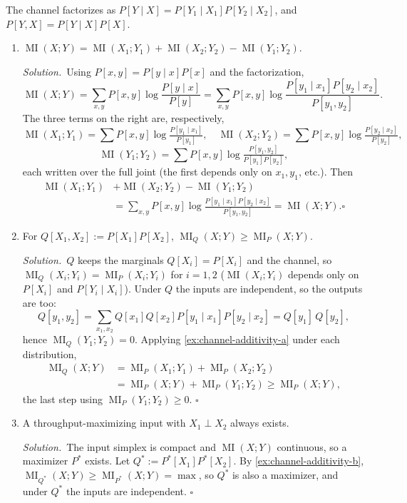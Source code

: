 \documentclass[11pt]{article}
\DeclareMathOperator{\MI}{MI}
\newcommand{\soln}{\medskip\noindent\textit{Solution.}\ }
\renewcommand{\qed}{\ensuremath{\square}}
\begin{document}
\begin{solution}
The channel factorizes as $P[Y\mid X]=P[Y_1\mid X_1]P[Y_2\mid X_2]$, and $P[Y,X]=P[Y\mid X]P[X]$.

\begin{enumerate}
\item $\MI(X;Y)=\MI(X_1;Y_1)+\MI(X_2;Y_2)-\MI(Y_1;Y_2)$.

\soln Using $P[x,y]=P[y\mid x]P[x]$ and the factorization,
\[
  \MI(X;Y)=\sum_{x,y}P[x,y]\log\frac{P[y\mid x]}{P[y]}
  =\sum_{x,y}P[x,y]\log\frac{P[y_1\mid x_1]P[y_2\mid x_2]}{P[y_1,y_2]}.
\]
The three terms on the right are, respectively,
\[
  \MI(X_1;Y_1)=\sum P[x,y]\log\tfrac{P[y_1\mid x_1]}{P[y_1]},\quad
  \MI(X_2;Y_2)=\sum P[x,y]\log\tfrac{P[y_2\mid x_2]}{P[y_2]},
\]
\[
  \MI(Y_1;Y_2)=\sum P[x,y]\log\tfrac{P[y_1,y_2]}{P[y_1]P[y_2]},
\]
each written over the full joint (the first depends only on $x_1,y_1$, etc.). Then
\begin{align*}
  \MI(X_1;Y_1)&+\MI(X_2;Y_2)-\MI(Y_1;Y_2)\\
  &=\sum_{x,y}P[x,y]\log\frac{P[y_1\mid x_1]P[y_2\mid x_2]}{P[y_1,y_2]} =\MI(X;Y). \qed
\end{align*}

\item For $Q[X_1,X_2]:=P[X_1]P[X_2]$, $\MI_Q(X;Y)\ge\MI_P(X;Y)$.

\soln $Q$ keeps the marginals $Q[X_i]=P[X_i]$ and the channel, so $\MI_Q(X_i;Y_i)=\MI_P(X_i;Y_i)$ for $i=1,2$ ($\MI(X_i;Y_i)$ depends only on $P[X_i]$ and $P[Y_i\mid X_i]$). Under $Q$ the inputs are independent, so the outputs are too:
\[
  Q[y_1,y_2]=\sum_{x_1,x_2}Q[x_1]Q[x_2]P[y_1\mid x_1]P[y_2\mid x_2]=Q[y_1]\,Q[y_2],
\]
hence $\MI_Q(Y_1;Y_2)=0$. Applying \cref{ex:channel-additivity-a} under each distribution,
\begin{align*}
  \MI_Q(X;Y)&=\MI_P(X_1;Y_1)+\MI_P(X_2;Y_2)\\
  &=\MI_P(X;Y)+\MI_P(Y_1;Y_2)\ge\MI_P(X;Y),
\end{align*}
the last step using $\MI_P(Y_1;Y_2)\ge0$. \qed

\item A throughput-maximizing input with $X_1\perp X_2$ always exists.

\soln The input simplex is compact and $\MI(X;Y)$ continuous, so a maximizer $P^*$ exists. Let $Q^*:=P^*[X_1]P^*[X_2]$. By \cref{ex:channel-additivity-b}, $\MI_{Q^*}(X;Y)\ge\MI_{P^*}(X;Y)=\max$, so $Q^*$ is also a maximizer, and under $Q^*$ the inputs are independent. \qed
\end{enumerate}
\end{solution}
\end{document}
